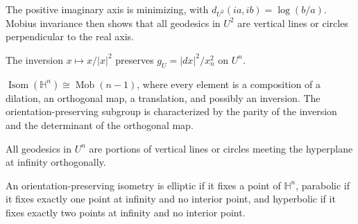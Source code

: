 \begin{example}
\label{ex:chow-iv-hyperbolic-plane-geodesics}
The positive imaginary axis is minimizing, with
\(d_{U^2}(ia,ib)=\log(b/a)\).  Mobius invariance then shows that all
geodesics in \(U^2\) are vertical lines or circles perpendicular to the real
axis.
\end{example}

\begin{lemma}
\label{lem:chow-iv-inversion-hyperbolic-isometry}
The inversion \(x\mapsto x/|x|^2\) preserves \(g_U=|dx|^2/x_n^2\) on \(U^n\).
\end{lemma}

\begin{lemma}
\label{lem:chow-iv-isometry-group-hyperbolic-space}
\(\operatorname{Isom}(\mathbb H^n)\cong\operatorname{Mob}(n-1)\), where every
element is a composition of a dilation, an orthogonal map, a translation, and
possibly an inversion.  The orientation-preserving subgroup is characterized
by the parity of the inversion and the determinant of the orthogonal map.
\end{lemma}

\begin{lemma}
\label{lem:chow-iv-upper-half-space-geodesics}
All geodesics in \(U^n\) are portions of vertical lines or circles meeting the
hyperplane at infinity orthogonally.
\end{lemma}

\begin{definition}
\label{def:chow-iv-isometry-types}
An orientation-preserving isometry is elliptic if it fixes a point of
\(\mathbb H^n\), parabolic if it fixes exactly one point at infinity and no
interior point, and hyperbolic if it fixes exactly two points at infinity and
no interior point.
\end{definition}

